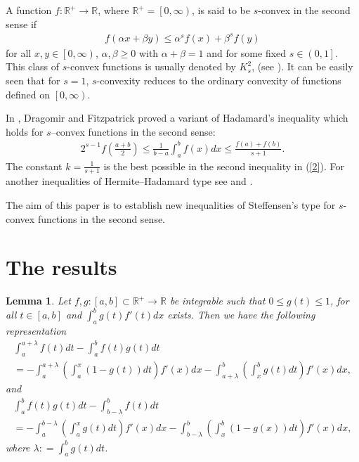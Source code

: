 \documentclass{amsart}
\theoremstyle{plain}
\newtheorem{lemma}{Lemma}
\numberwithin{equation}{section}
\begin{document}
A function $f:\mathbb{R}^{+}\rightarrow \mathbb{R}$, where
$\mathbb{R}^{+}=\left[ {0,\infty }\right) $, is said to be
$s$-convex in the second sense if
\begin{align*}
f\left( {\alpha x+\beta y}\right) \leq \alpha ^{s}f\left( x\right) +{\beta }^{s}f\left( y\right)
\end{align*}
for all $x,y\in \left[ {0,\infty }\right) $, $\alpha ,\beta \geq 0$ with $\alpha +\beta =1$ and for some fixed $s\in \left( {0,1}\right] $.
This class of $s$-convex functions is usually denoted by
$K_{s}^{2}$, (see \cite{RefF}). It can be easily seen that for
$s=1$, $s$-convexity reduces to the ordinary convexity of
functions defined on $\left[ {0,\infty }\right) $.

In \cite{RefD}, Dragomir and Fitzpatrick proved a variant of
Hadamard's inequality which holds for $s$--convex functions in the
second sense:
\begin{align}
2^{s-1}f\left( {\frac{{a+b}}{2}}\right) \leq \frac{1}{{b-a}}\int_{a}^{b}{f\left( x\right) dx}\leq \frac{{f\left( a\right) +f\left( b\right)
}}{{s+1}}. \label{2}
\end{align}
The constant $k=\frac{1}{{s+1}}$ is the best possible in the
second inequality in (\ref{2}). For another inequalities of
Hermite--Hadamard type see \cite{RefB} and \cite{RefG}.

The aim of this paper is to establish new inequalities of
Steffensen's type for $s$-convex functions in the second sense.


\section{The results }

\begin{lemma}
\label{lemma} Let $f,g: [a,b] \subset \mathbb{R}^{+}\to
\mathbb{R}$ be integrable such that $0 \le g(t) \le 1$, for all $t
\in [a,b]$ and $\int_a^b {g\left( t \right)f'\left( t \right)dx}$
exists. Then we have the following representation
\begin{multline}
\label{eq2.1}\int_a^{a + \lambda } {f\left( t \right)dt}  -
\int_a^b {f\left( t \right)g\left( t \right)dt}
\\
= -  \int_a^{a + \lambda } {\left( {\int_a^x {\left( {1 - g\left(
t \right)} \right)dt} } \right)f'\left( x \right)dx} - \int_{a +
\lambda }^b {\left( {\int_x^b {g\left( t \right)dt} }
\right)f'\left( x \right)dx} ,
\end{multline}
and
\begin{multline}
\label{eq2.2} \int_a^b {f\left( t \right)g\left( t \right)dt -
\int_{b - \lambda }^b {f\left( t \right)dt} }
\\
=  - \int_a^{b - \lambda } {\left( {\int_a^x {g(t)dt} }
\right)f'\left( x \right)dx}  - \int_{b - \lambda }^b {\left(
{\int_x^b {\left( {1 - g\left( x \right)} \right)dt} }
\right)f'\left( x \right)dx},
\end{multline}
where $\lambda : = \int_a^b {g\left( t \right)dt}$.
\end{lemma}
\end{document}

